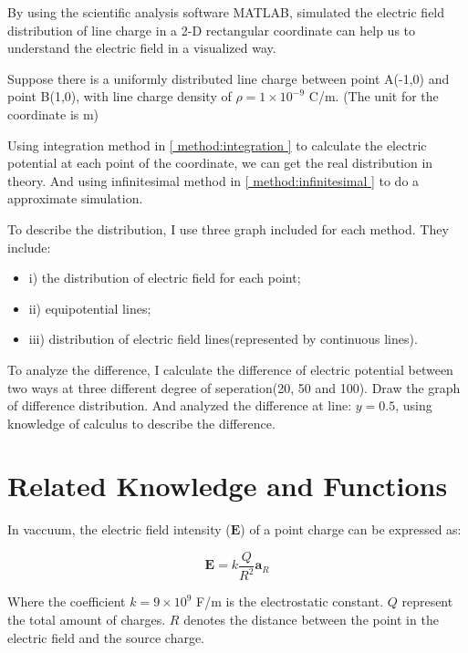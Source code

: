 \documentclass[10pt, journal, final]{IEEEtran}
\begin{document}
By using the scientific analysis software MATLAB,
simulated the electric field distribution of
line charge in a 2-D rectangular coordinate can help us to
understand the electric field in a visualized way.\par

Suppose there is a uniformly distributed line charge
between point A(-1,0) and point B(1,0),
with line charge density of $\rho = 1 \times 10^{-9}$ C/m.
(The unit for the coordinate is m)\par

Using integration method in \ref{ method:integration }
to calculate the electric potential at each point of the coordinate,
we can get the real distribution in theory.
And using infinitesimal method in \ref{ method:infinitesimal }
to do a approximate simulation.\par

To describe the distribution, I use three graph included for each method.
They include:
\begin{itemize}
    \item i)   the distribution of electric field for each point;
    \item ii)  equipotential lines;
    \item iii) distribution of electric field lines(represented by continuous lines).
\end{itemize}\par
To analyze the difference, I calculate the difference of electric potential
between two ways at three different degree of seperation(20, 50 and 100).
Draw the graph of difference distribution.
And analyzed the difference at line: $y=0.5$,
using knowledge of calculus to describe the difference.

\section{
  Related Knowledge and Functions
 }
\label{sec:Related and Func}

In vaccuum, the electric field intensity ($\mathbf{E}$)
of a point charge can be expressed as:

\begin{equation}
    \mathbf{E} = k\frac{Q}{R^2}\mathbf{a}_R
\end{equation}

Where the coefficient $k = 9 \times 10^9$ F/m is the electrostatic constant.
$Q$ represent the total amount of charges. $R$ denotes the distance
between the point in the electric field and the source charge.\par
\end{document}
